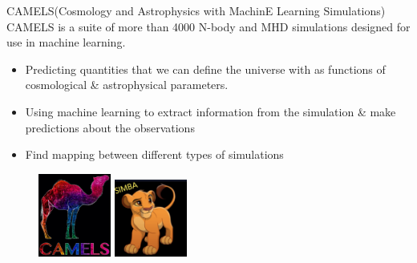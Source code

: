 \documentclass[10pt,t]{beamer}
\begin{document}
\begin{frame}{CAMELS(Cosmology and Astrophysics with MachinE Learning Simulations)}
CAMELS is a suite of more than 4000 N-body and MHD simulations designed for use in machine learning.
\begin{itemize}
    \item Predicting quantities that we can define the universe with as functions of cosmological & astrophysical parameters.
    \item Using machine learning to extract information from the simulation & make predictions about the observations
    \item Find mapping between different types of simulations
\end{itemize}
\begin{figure}
\includegraphics[width=90]{img/camels.png}
\includegraphics[width=90]{img/simba.png}    

\end{figure}
\end{frame}
\end{document}
